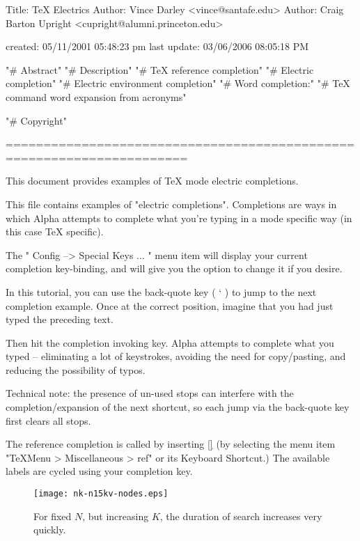 
Title:                  TeX Electrics
Author:                 Vince Darley <vince@santafe.edu>
Author:                 Craig Barton Upright <cupright@alumni.princeton.edu>

    created: 05/11/2001 {05:48:23 pm}
last update: 03/06/2006 {08:05:18 PM}



"# Abstract"
"# Description"
"# TeX reference completion"
"# Electric completion"
"# Electric environment completion"
"# Word completion:"
"# TeX command word expansion from acronyms"

"# Copyright"


	======================================================================



This document provides examples of TeX mode electric completions.



This file contains examples of "electric completions".  Completions are
ways in which Alpha attempts to complete what you're typing in a mode
specific way (in this case TeX specific).

The " Config --> Special Keys ...  " menu item will display your current
completion key-binding, and will give you the option to change it if you
desire.

In this tutorial, you can use the back-quote key ( ` ) to jump to the next
completion example.  Once at the correct position, imagine that you had
just typed the preceding text.

Then hit the completion invoking key.  Alpha attempts to complete what you
typed -- eliminating a lot of keystrokes, avoiding the need for
copy/pasting, and reducing the possibility of typos.

Technical note: the presence of un-used stops can interfere with the 
completion/expansion of the next shortcut, so each jump via the 
back-quote key first clears all stops.



The reference completion is called by inserting \ref{} (by selecting the menu
item "TeXMenu > Miscellaneous > ref" or its Keyboard Shortcut.)  The
available labels are cycled using your completion key.
	
	\begin{figure}
	    \centerline{\texttt{[image: nk-n15kv-nodes.eps]}}
	    \caption{For fixed $N$, but increasing $K$, the duration of search 
	    increases very quickly.}
	    \protect\label{fig:nk-n15kv-nodes}
	\end{figure}

